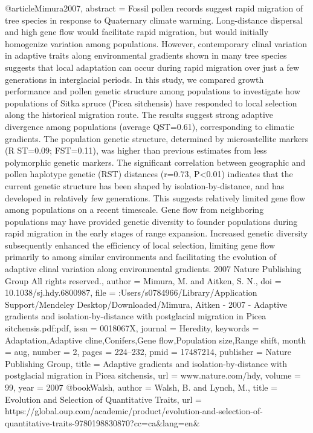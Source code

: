 @article{Mimura2007,
abstract = {Fossil pollen records suggest rapid migration of tree species in response to Quaternary climate warming. Long-distance dispersal and high gene flow would facilitate rapid migration, but would initially homogenize variation among populations. However, contemporary clinal variation in adaptive traits along environmental gradients shown in many tree species suggests that local adaptation can occur during rapid migration over just a few generations in interglacial periods. In this study, we compared growth performance and pollen genetic structure among populations to investigate how populations of Sitka spruce (Picea sitchensis) have responded to local selection along the historical migration route. The results suggest strong adaptive divergence among populations (average QST=0.61), corresponding to climatic gradients. The population genetic structure, determined by microsatellite markers (R ST=0.09; FST=0.11), was higher than previous estimates from less polymorphic genetic markers. The significant correlation between geographic and pollen haplotype genetic (RST) distances (r=0.73, P{\textless}0.01) indicates that the current genetic structure has been shaped by isolation-by-distance, and has developed in relatively few generations. This suggests relatively limited gene flow among populations on a recent timescale. Gene flow from neighboring populations may have provided genetic diversity to founder populations during rapid migration in the early stages of range expansion. Increased genetic diversity subsequently enhanced the efficiency of local selection, limiting gene flow primarily to among similar environments and facilitating the evolution of adaptive clinal variation along environmental gradients. {\textcopyright} 2007 Nature Publishing Group All rights reserved.},
author = {Mimura, M. and Aitken, S. N.},
doi = {10.1038/sj.hdy.6800987},
file = {:Users/s0784966/Library/Application Support/Mendeley Desktop/Downloaded/Mimura, Aitken - 2007 - Adaptive gradients and isolation-by-distance with postglacial migration in Picea sitchensis.pdf:pdf},
issn = {0018067X},
journal = {Heredity},
keywords = {Adaptation,Adaptive cline,Conifers,Gene flow,Population size,Range shift},
month = {aug},
number = {2},
pages = {224--232},
pmid = {17487214},
publisher = {Nature Publishing Group},
title = {{Adaptive gradients and isolation-by-distance with postglacial migration in Picea sitchensis}},
url = {www.nature.com/hdy},
volume = {99},
year = {2007}
}
@book{Walsh,
author = {Walsh, B. and Lynch, M.},
title = {{Evolution and Selection of Quantitative Traits}},
url = {https://global.oup.com/academic/product/evolution-and-selection-of-quantitative-traits-9780198830870?cc=ca{\&}lang=en{\&}}
}
